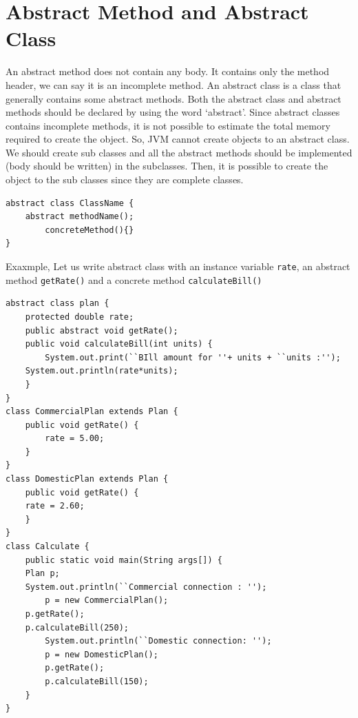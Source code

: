 \documentclass[11pt,a4paper]{article}
\author{TalentSprint}
\date{}
\begin{document}
\section*{Abstract Method and Abstract Class}
An abstract method does not contain any body. It contains only the method header, we can say it is an incomplete method. An abstract class is a class that generally contains some abstract methods. Both the abstract class and abstract methods should be declared by using the word `abstract'. Since abstract classes contains incomplete methods, it is not possible to estimate the total memory required to create the object. So, JVM cannot create objects to an abstract class. We should create sub classes and all the abstract methods should be implemented (body should be written) in the subclasses. Then, it is possible to create the object to the sub classes since they are complete classes.

\begin{lstlisting}[numbers=none]
abstract class ClassName {
    abstract methodName();
        concreteMethod(){}
}
\end{lstlisting}

Exaxmple, Let us write abstract class with an instance variable  \texttt{rate}, an abstract method \texttt{getRate()} and a concrete method \texttt{calculateBill()}
\begin{lstlisting}[numbers=none]
abstract class plan {
    protected double rate;
    public abstract void getRate();
    public void calculateBill(int units) {
        System.out.print(``BIll amount for ''+ units + ``units :'');
	System.out.println(rate*units);
    }
}
class CommercialPlan extends Plan {
    public void getRate() {
        rate = 5.00;
    }
}
class DomesticPlan extends Plan {
    public void getRate() {
	rate = 2.60;
    }
}
class Calculate {
    public static void main(String args[]) { 
	Plan p;
	System.out.println(``Commercial connection : '');
        p = new CommercialPlan();
	p.getRate();
	p.calculateBill(250);
        System.out.println(``Domestic connection: '');
        p = new DomesticPlan();
        p.getRate();
        p.calculateBill(150);
    }
}
\end{lstlisting}
\end{document}
